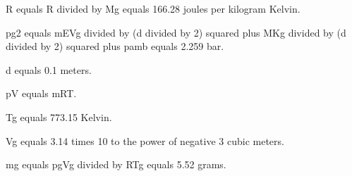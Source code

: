 R equals R divided by Mg equals 166.28 joules per kilogram Kelvin.

pg2 equals mEVg divided by (d divided by 2) squared plus MKg divided by (d divided by 2) squared plus pamb equals 2.259 bar.

d equals 0.1 meters.

pV equals mRT.

Tg equals 773.15 Kelvin.

Vg equals 3.14 times 10 to the power of negative 3 cubic meters.

mg equals pgVg divided by RTg equals 5.52 grams.